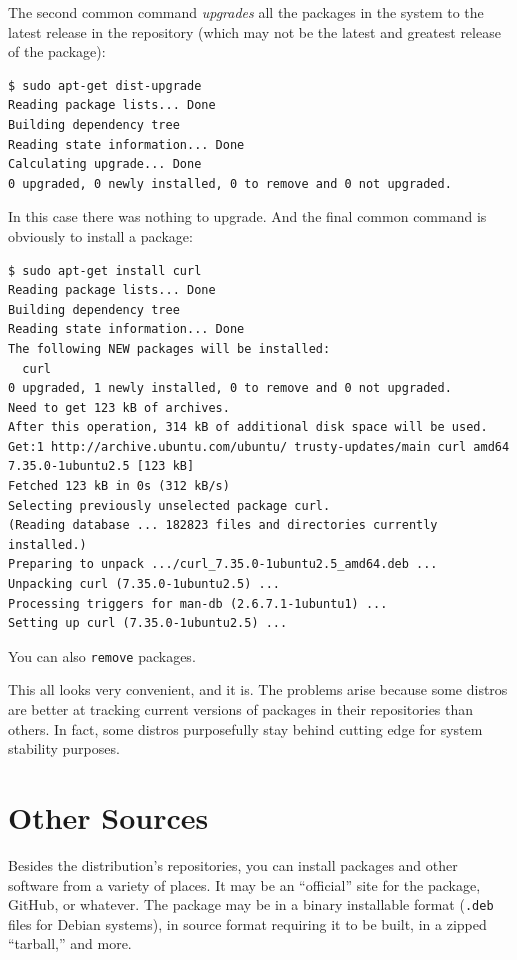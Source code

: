 \documentclass[10pt,]{book}
\numberwithin{figure}{chapter}
\begin{document}
The second common command \emph{upgrades} all the packages in the system
to the latest release in the repository (which may not be the latest and
greatest release of the package):

\begin{verbatim}
$ sudo apt-get dist-upgrade
Reading package lists... Done
Building dependency tree       
Reading state information... Done
Calculating upgrade... Done
0 upgraded, 0 newly installed, 0 to remove and 0 not upgraded.
\end{verbatim}

In this case there was nothing to upgrade. And the final common command
is obviously to install a package:

\begin{verbatim}
$ sudo apt-get install curl
Reading package lists... Done
Building dependency tree       
Reading state information... Done
The following NEW packages will be installed:
  curl
0 upgraded, 1 newly installed, 0 to remove and 0 not upgraded.
Need to get 123 kB of archives.
After this operation, 314 kB of additional disk space will be used.
Get:1 http://archive.ubuntu.com/ubuntu/ trusty-updates/main curl amd64 7.35.0-1ubuntu2.5 [123 kB]
Fetched 123 kB in 0s (312 kB/s)
Selecting previously unselected package curl.
(Reading database ... 182823 files and directories currently installed.)
Preparing to unpack .../curl_7.35.0-1ubuntu2.5_amd64.deb ...
Unpacking curl (7.35.0-1ubuntu2.5) ...
Processing triggers for man-db (2.6.7.1-1ubuntu1) ...
Setting up curl (7.35.0-1ubuntu2.5) ...
\end{verbatim}

You can also \texttt{remove} packages.

This all looks very convenient, and it is. The problems arise because
some distros are better at tracking current versions of packages in
their repositories than others. In fact, some distros purposefully stay
behind cutting edge for system stability purposes.

\section{Other Sources}\label{other-sources}

Besides the distribution's repositories, you can install packages and
other software from a variety of places. It may be an ``official'' site
for the package, GitHub, or whatever. The package may be in a binary
installable format (\texttt{.deb} files for Debian systems), in source
format requiring it to be built, in a zipped ``tarball,'' and more.
\end{document}
